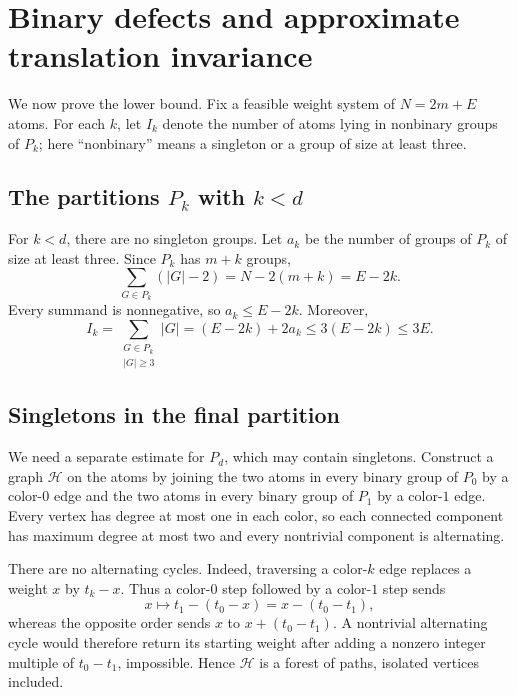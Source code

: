 \documentclass[11pt]{article}
\theoremstyle{definition}
\newcommand{\1}{\mathbf{1}}
\begin{document}
\section{Binary defects and approximate translation invariance}

We now prove the lower bound.  Fix a feasible weight system of $N=2m+E$ atoms.
For each $k$, let $I_k$ denote the number of atoms lying in nonbinary groups of $P_k$; here ``nonbinary'' means a singleton or a group of size at least three.

\subsection{The partitions $P_k$ with $k<d$}

For $k<d$, there are no singleton groups.  Let $a_k$ be the number of groups of $P_k$ of size at least three.  Since $P_k$ has $m+k$ groups,
\begin{equation}\label{eq:deviation-k}
  \sum_{G\in P_k}(|G|-2)
  =N-2(m+k)=E-2k.
\end{equation}
Every summand is nonnegative, so $a_k\le E-2k$.  Moreover,
\begin{equation}\label{eq:Ik-small}
  I_k
  =\sum_{\substack{G\in P_k\\|G|\ge3}}|G|
  =(E-2k)+2a_k
  \le3(E-2k)\le3E.
\end{equation}

\subsection{Singletons in the final partition}

We need a separate estimate for $P_d$, which may contain singletons.  Construct a graph $\mathcal H$ on the atoms by joining the two atoms in every binary group of $P_0$ by a color-$0$ edge and the two atoms in every binary group of $P_1$ by a color-$1$ edge.  Every vertex has degree at most one in each color, so each connected component has maximum degree at most two and every nontrivial component is alternating.

There are no alternating cycles.  Indeed, traversing a color-$k$ edge replaces a weight $x$ by $t_k-x$.  Thus a color-$0$ step followed by a color-$1$ step sends
\[
  x\longmapsto t_1-(t_0-x)=x-(t_0-t_1),
\]
whereas the opposite order sends $x$ to $x+(t_0-t_1)$.  A nontrivial alternating cycle would therefore return its starting weight after adding a nonzero integer multiple of $t_0-t_1$, impossible.  Hence $\mathcal H$ is a forest of paths, isolated vertices included.
\end{document}

